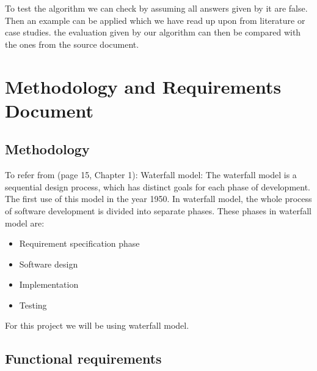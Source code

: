 \documentclass{report}
\begin{document}
To test the algorithm we can check by assuming all answers given by it are false. Then an example can be applied which we have read up upon from literature or case studies. the evaluation given by our algorithm can then be compared with the ones from the source document.



\chapter{Methodology and Requirements Document}
\label{cha:methrecdoc}

\section{Methodology}
\label{sec:meth}

To refer from \cite{Hamlet2001TheEngineeringofSoftware}(page 15, Chapter 1): Waterfall model: The waterfall model is a sequential design process, which has distinct goals for each phase of development. The first use of this model in the year 1950. In waterfall model, the whole process of software development is divided into separate phases. These phases in waterfall model are:
\begin{itemize}
\item Requirement specification phase
\item Software design
\item Implementation 
\item Testing 



\end{itemize}

For this project we will be using waterfall model. 


\section{Functional requirements}
\label{sec:functreq}
\end{document}
